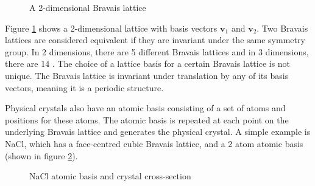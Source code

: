 \documentclass[12pt]{article}
\begin{document}
\begin{figure}
\centering
{}%
\caption{A 2-dimensional Bravais lattice}
\label{fig:lattice_basis}
\end{figure}

Figure \ref{fig:lattice_basis} shows a 2-dimensional lattice with basis vectors $\mathbf{v}_1$ and $\mathbf{v}_2$. Two Bravais lattices are considered equivalent if they are invariant under the same symmetry group. In 2 dimensions, there are 5 different Bravais lattices and in 3 dimensions, there are 14 \cite{kittel2005introduction}. The choice of a lattice basis for a certain Bravais lattice is not unique.
The Bravais lattice is invariant under translation by any of its basis vectors, meaning it is a periodic structure. 

Physical crystals also have an atomic basis consisting of a set of atoms and positions for these atoms. The atomic basis is repeated at each point on the underlying Bravais lattice and generates the physical crystal. 
A simple example is NaCl, which has a face-centred cubic Bravais lattice, and a 2 atom atomic basis (shown in figure \ref{fig:nacl_lattice}).
\begin{figure}[t!]
    \centering
    \qquad
    \qquad
    \caption{NaCl atomic basis and crystal cross-section}
\label{fig:nacl_lattice}
\end{figure}
\end{document}
